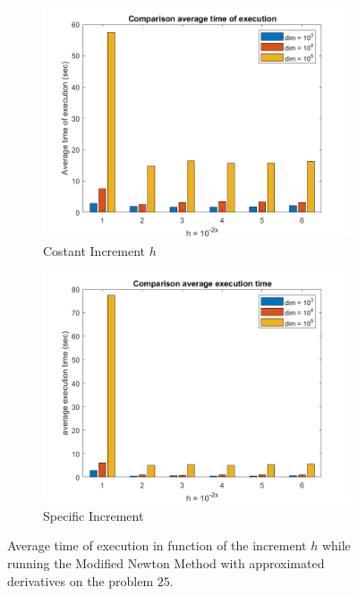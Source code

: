 \begin{figure}[htbp]
    \centering
    \begin{subfigure}[t]{0.45\textwidth}  %
        \centering
        \includegraphics[width=\textwidth]{img/pb25_MN_difffinite_COST_timeofexec.png}
        \caption{Costant Increment $h$}
    \end{subfigure}
    \hspace{1cm} %
    \begin{subfigure}[t]{0.45\textwidth}
        \centering
        \includegraphics[width=\textwidth]{img/pb25_MN_difffinite_REL_timeofexec.png}
        \caption{Specific Increment }
    \end{subfigure}
    \caption{ \small Average time of execution in function of the increment $h$  while running the Modified Newton Method with approximated derivatives on the problem $25$.}
\end{figure}

